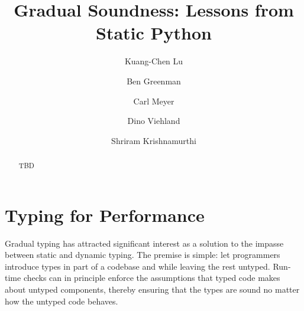 \documentclass[a4paper,english,cleveref,autoref,thm-restate,anonymous,]{lipics-v2021}
\title{Gradual Soundness: Lessons from Static Python}
\author{Kuang-Chen Lu}{Department of Computer Science, Brown University, USA}{LuKuangchen1024@gmail.com}{}{}
\author{Ben Greenman}{Department of Computer Science, Brown University, USA}{benjamin.l.greenman@gmail.com}{0000-0001-7078-9287}{}
\author{Carl Meyer}{Facebook, Inc.}{carljm@fb.com}{}{}
\author{Dino Viehland}{Facebook, Inc.}{dinoviehland@fb.com}{}{}
\author{Shriram Krishnamurthi}{Department of Computer Science, Brown University, USA}{shriram@brown.edu}{0000-0001-5184-1975}{}
\begin{document}
\maketitle

\newcommand{\shorturl}[2]{\href{#1#2}{#2}}
\newcommand{\SP}{Static Python}
\newcommand{\code}[1]{\texttt{#1}}
\newcommand{\defeq}{=}
\newcommand{\mfeq}{=}
\newcommand{\langmid}{\mathrel{\mathbf{\Big\vert}}}
\newenvironment{langarray}{\(\def\arraystretch{1.5}\begin{array}{l@{\hspace{2mm}}c@{\hspace{2mm}}l}}{\end{array}\)}

\newcommand{\typefont}[1]{\mathsf{#1}}
\newcommand{\paramtype}[2]{#1[#2]}
\newcommand{\sptype}{\typefont{T}}
\newcommand{\sptclass}{\typefont{C}}
\newcommand{\sptint}{\typefont{Int}}
\newcommand{\sptfloat}{\typefont{Float}}
\newcommand{\sptdyn}{\typefont{Dynamic}}
\newcommand{\sptobject}{\typefont{Object}}
\newcommand{\sptnone}{\typefont{NoneType}}
\newcommand{\sptinstanceof}[1]{\paramtype{\typefont{Instance}}{#1}}
\newcommand{\sptfun}[2]{#1 \rightarrow #2}
\newcommand{\sptunion}[2]{#1 \cup #2}
\newcommand{\sptoptional}[1]{\paramtype{\typefont{Optional}}{#1}}
\newcommand{\sptpydict}[2]{\paramtype{\typefont{PyDict}}{#1, #2}}
\newcommand{\sptchkdict}[2]{\paramtype{\typefont{ChkDict}}{#1, #2}}

\newcommand{\spexpr}{e}
\newcommand{\spvalue}{v}

\newcommand{\sprred}{\rightarrow^*}

\newcommand{\mfapply}[2]{#1\,(#2)}
\newcommand{\mffont}[1]{\mathit{#1}}
\newcommand{\mftypeF}[1]{\mfapply{\mffont{F}}{#1}}
\newcommand{\mfopt}[1]{\mfapply{\mffont{opt}}{#1}}

\newcommand{\sperror}{\mathrm{Error}}

\begin{abstract}
  TBD
\end{abstract}


\section{Typing for Performance}
\label{s:intro}

Gradual typing has attracted significant interest as a solution to
the impasse between static and dynamic typing.
The premise is simple: let programmers introduce types in part of a
codebase and while leaving the rest untyped.
Run-time checks can in principle enforce the assumptions that
typed code makes about untyped components, thereby ensuring that
the types are sound no matter how the untyped code behaves.
\end{document}
